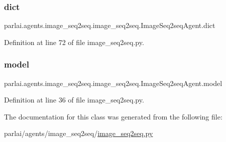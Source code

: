 \subsubsection{\texorpdfstring{dict}{dict}}
{\footnotesize\ttfamily parlai.\+agents.\+image\+\_\+seq2seq.\+image\+\_\+seq2seq.\+Image\+Seq2seq\+Agent.\+dict}



Definition at line 72 of file image\+\_\+seq2seq.\+py.

\mbox{\label{classparlai_1_1agents_1_1image__seq2seq_1_1image__seq2seq_1_1ImageSeq2seqAgent_ac9d0f2cb0dd0d8dfcfa4479d00e05333}} 
\subsubsection{\texorpdfstring{model}{model}}
{\footnotesize\ttfamily parlai.\+agents.\+image\+\_\+seq2seq.\+image\+\_\+seq2seq.\+Image\+Seq2seq\+Agent.\+model}



Definition at line 36 of file image\+\_\+seq2seq.\+py.



The documentation for this class was generated from the following file\+:\begin{DoxyCompactItemize}
\item 
parlai/agents/image\+\_\+seq2seq/\hyperlink{image__seq2seq_8py}{image\+\_\+seq2seq.\+py}\end{DoxyCompactItemize}
